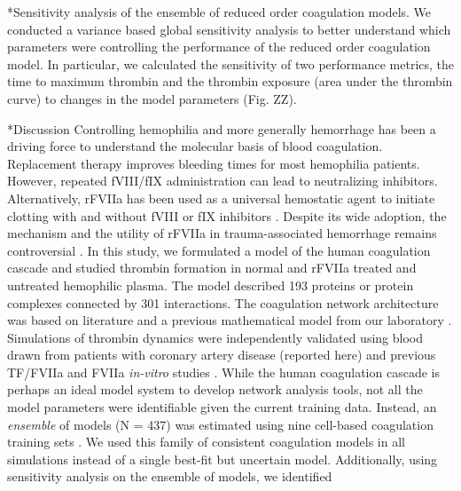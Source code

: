 \documentclass[12pt]{article}
\makeatletter
\renewcommand\subsection{\@startsection
	{subsection}{2}{0mm}
	{-0.05in}
	{-0.5\baselineskip}
	{\normalfont\normalsize\bfseries}}
\renewcommand\section{\@startsection
	{subsection}{2}{0mm}
	{-0.2in}
	{0.05\baselineskip}
	{\normalfont\large\bfseries}}
\makeatother
\begin{document}
\subsection*{Sensitivity analysis of the ensemble of reduced order coagulation models.}
We conducted a variance based global sensitivity analysis to better understand which parameters were controlling the performance of the reduced order coagulation model. 
In particular, we calculated the sensitivity of two performance metrics, the time to maximum thrombin and the thrombin exposure (area under the thrombin curve) to
changes in the model parameters (Fig. ZZ).  


\clearpage

\section*{Discussion}
Controlling hemophilia and more generally hemorrhage has been a driving force to understand the molecular basis of blood coagulation.
Replacement therapy improves bleeding times for most hemophilia patients. However, repeated fVIII/fIX administration can lead to neutralizing inhibitors. 
Alternatively, rFVIIa has been used as a universal hemostatic agent to initiate clotting with and without fVIII or fIX inhibitors \cite{Hedner:2008rm}.
Despite its wide adoption, the mechanism and the utility of rFVIIa in trauma-associated hemorrhage remains controversial \cite{Duchesne:2008hw}. 
In this study, we formulated a model of the human coagulation cascade and studied thrombin formation in normal and rFVIIa treated and untreated
hemophilic plasma. The model described 193 proteins or protein complexes connected by 301 interactions. 
The coagulation network architecture was based on literature and a previous mathematical model from our laboratory \cite{VARNER2007}.
Simulations of thrombin dynamics were independently validated using blood drawn from patients with coronary artery disease (reported here) and previous TF/FVIIa and FVIIa 
\emph{in-vitro} studies \cite{BUTENAS2002}.
While the human coagulation cascade is perhaps an ideal model system to develop network analysis tools, not all the model parameters were identifiable given the current training data.
Instead, an \emph{ensemble} of models (N = 437) was estimated using nine cell-based coagulation training sets \cite{ALLEN2007}.
We used this family of consistent coagulation models in all simulations instead of a single best-fit but uncertain model.
Additionally, using sensitivity analysis on the ensemble of models, we identified 
\end{document}
